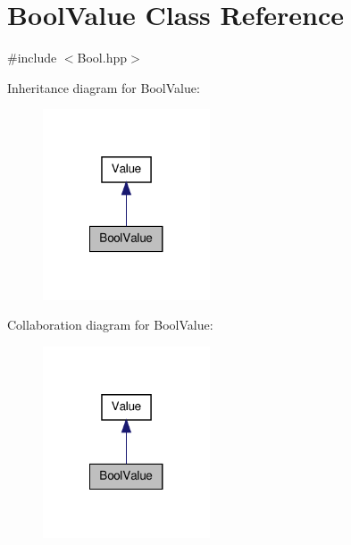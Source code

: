 \hypertarget{class_bool_value}{\section{Bool\-Value Class Reference}
\label{class_bool_value}
}


{\ttfamily \#include $<$Bool.\-hpp$>$}



Inheritance diagram for Bool\-Value\-:
\nopagebreak
\begin{figure}[H]
\begin{center}
\leavevmode
\includegraphics[width=140pt]{class_bool_value__inherit__graph}
\end{center}
\end{figure}


Collaboration diagram for Bool\-Value\-:
\nopagebreak
\begin{figure}[H]
\begin{center}
\leavevmode
\includegraphics[width=140pt]{class_bool_value__coll__graph}
\end{center}
\end{figure}
